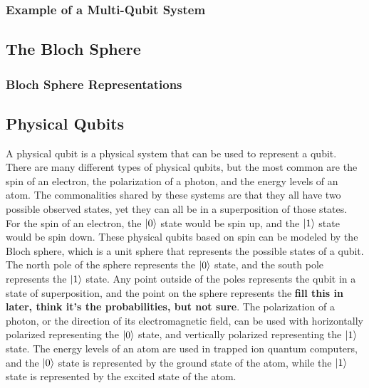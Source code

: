 \documentclass{article}
\begin{document}
\subsubsection{Example of a Multi-Qubit System}
\label{sec:examplemultisystem}
\subsection{The Bloch Sphere}
\label{sec:blochsphere}
\subsubsection{Bloch Sphere Representations}
\label{sec:blochspherereps}
\subsection{Physical Qubits}
\label{sec:physicalqubits}

A physical qubit is a physical system that can be used to represent a qubit. There are many different types of physical qubits, but the most common are the spin of an electron,
the polarization of a photon, and the energy levels of an atom. The commonalities shared by these systems are that they all have two possible observed states, yet they can all
be in a superposition of those states. For the spin of an electron, the $\ket{0}$ state would be spin up, and the $\ket{1}$ state would be spin down. These physical qubits based 
on spin can be modeled by the Bloch sphere, which is a unit sphere that represents the possible states of a qubit. The north pole of the sphere represents the $\ket{0}$ state,
and the south pole represents the $\ket{1}$ state. Any point outside of the poles represents the qubit in a state of superposition, and the point on the sphere represents the
\textbf{fill this in later, think it's the probabilities, but not sure}. The polarization of a photon, or the direction of its electromagnetic field, can be used with 
horizontally polarized representing the $\ket{0}$ state, and vertically polarized representing the $\ket{1}$ state. The energy levels of an atom are used in trapped ion 
quantum computers, and the $\ket{0}$ state is represented by the ground state of the atom, while the $\ket{1}$ state is represented by the excited state of the atom.

\vspace{5mm}
\end{document}
